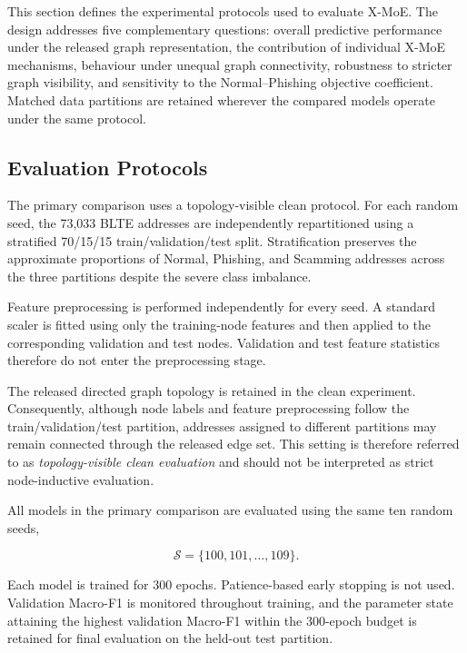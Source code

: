 \documentclass{ieeeaccess}
\begin{document}
This section defines the experimental protocols used to evaluate X-MoE. The design addresses five complementary questions: overall predictive performance under the released graph representation, the contribution of individual X-MoE mechanisms, behaviour under unequal graph connectivity, robustness to stricter graph visibility, and sensitivity to the Normal--Phishing objective coefficient. Matched data partitions are retained wherever the compared models operate under the same protocol.

\subsection{Evaluation Protocols}

The primary comparison uses a topology-visible clean protocol. For each random seed, the 73,033 BLTE addresses are independently repartitioned using a stratified 70/15/15 train/validation/test split. Stratification preserves the approximate proportions of Normal, Phishing, and Scamming addresses across the three partitions despite the severe class imbalance.

Feature preprocessing is performed independently for every seed. A standard scaler is fitted using only the training-node features and then applied to the corresponding validation and test nodes. Validation and test feature statistics therefore do not enter the preprocessing stage.

The released directed graph topology is retained in the clean experiment. Consequently, although node labels and feature preprocessing follow the train/validation/test partition, addresses assigned to different partitions may remain connected through the released edge set. This setting is therefore referred to as \textit{topology-visible clean evaluation} and should not be interpreted as strict node-inductive evaluation.

All models in the primary comparison are evaluated using the same ten random seeds,

\begin{equation}
\mathcal{S}
=
\{100,101,\ldots,109\}.
\end{equation}

Each model is trained for 300 epochs. Patience-based early stopping is not used. Validation Macro-F1 is monitored throughout training, and the parameter state attaining the highest validation Macro-F1 within the 300-epoch budget is retained for final evaluation on the held-out test partition.
\end{document}
